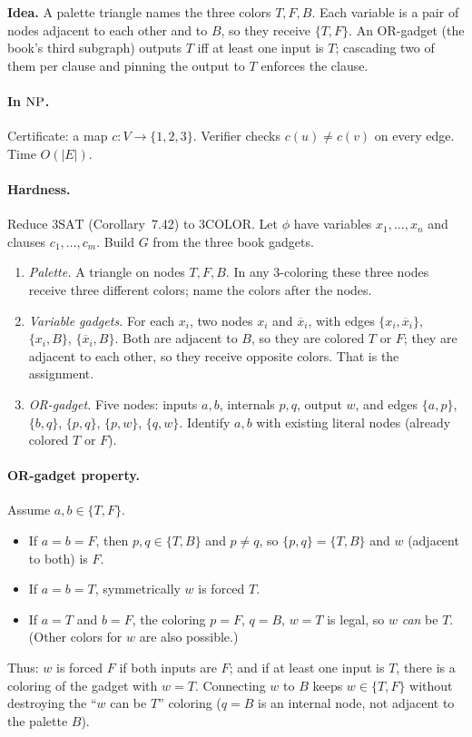 \begin{soln}
\textbf{Idea.} A palette triangle names the three colors $T,F,B$. Each variable is a pair of nodes adjacent to each other and to $B$, so they receive $\{T,F\}$. An OR-gadget (the book's third subgraph) outputs $T$ iff at least one input is $T$; cascading two of them per clause and pinning the output to $T$ enforces the clause.

\paragraph{In $\mathrm{NP}$.}
Certificate: a map $c\colon V\to\{1,2,3\}$. Verifier checks $c(u)\neq c(v)$ on every edge. Time $O(|E|)$.

\paragraph{Hardness.}
Reduce $3\mathrm{SAT}$ (Corollary~7.42) to $3\mathrm{COLOR}$. Let $\phi$ have variables $x_1,\dots,x_n$ and clauses $c_1,\dots,c_m$. Build $G$ from the three book gadgets.



\begin{enumerate}
\item \emph{Palette.} A triangle on nodes $T,F,B$. In any $3$-coloring these three nodes receive three different colors; name the colors after the nodes.
\item \emph{Variable gadgets.} For each $x_i$, two nodes $x_i$ and $\overline{x}_i$, with edges $\{x_i,\overline{x}_i\}$, $\{x_i,B\}$, $\{\overline{x}_i,B\}$. Both are adjacent to $B$, so they are colored $T$ or $F$; they are adjacent to each other, so they receive opposite colors. That is the assignment.
\item \emph{OR-gadget.} Five nodes: inputs $a,b$, internals $p,q$, output $w$, and edges $\{a,p\}$, $\{b,q\}$, $\{p,q\}$, $\{p,w\}$, $\{q,w\}$. Identify $a,b$ with existing literal nodes (already colored $T$ or $F$).
\end{enumerate}

\paragraph{OR-gadget property.}
Assume $a,b\in\{T,F\}$.
\begin{itemize}
\item If $a=b=F$, then $p,q\in\{T,B\}$ and $p\neq q$, so $\{p,q\}=\{T,B\}$ and $w$ (adjacent to both) is $F$.
\item If $a=b=T$, symmetrically $w$ is forced $T$.
\item If $a=T$ and $b=F$, the coloring $p=F$, $q=B$, $w=T$ is legal, so $w$ \emph{can} be $T$. (Other colors for $w$ are also possible.)
\end{itemize}
Thus: $w$ is forced $F$ if both inputs are $F$; and if at least one input is $T$, there is a coloring of the gadget with $w=T$. Connecting $w$ to $B$ keeps $w\in\{T,F\}$ without destroying the ``$w$ can be $T$'' coloring ($q=B$ is an internal node, not adjacent to the palette $B$).


\end{soln}
